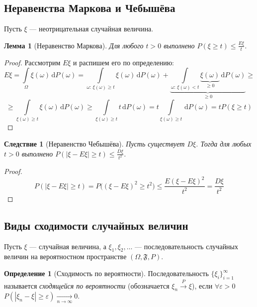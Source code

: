 \documentclass[11pt,openany,a4paper]{scrartcl}
\theoremstyle{plain}
\newtheorem{corollary}[theorem]{Следствие}
\newtheorem{lemma}[theorem]{Лемма}
\theoremstyle{definition}
\newtheorem{definition}[theorem]{Определение}
\newcommand{\underto}[1]{\xrightarrow[#1]{}}
\newcommand{\overto}[1]{\xrightarrow{#1}}
\newcommand{\dif}{\, \mathrm d}
\begin{document}
\subsection{Неравенства Маркова и Чебышёва}

Пусть $\xi$ — неотрицательная случайная величина.
\begin{lemma}[Неравенство Маркова]
    Для любого $t > 0$ выполнено $P(\xi \geqslant t) \leqslant \frac{E\xi}{t}$.
\end{lemma}
\begin{proof}
    Рассмотрим $E\xi$ и распишем его по определению:
    $$
    E\xi = \int\limits_\Omega \xi(\omega) \dif P(\omega) =
    \int\limits_{\omega:\, \xi(\omega)\geqslant t} \xi(\omega)\dif P(\omega) +
    \underbrace{\int\limits_{\omega:\, \xi(\omega) < t}
    \underbrace{\xi(\omega)}_{\geqslant 0} \dif P(\omega)}_{\geqslant 0} \geqslant
    $$
    $$
    \geqslant \int\limits_{\xi(\omega) \geqslant t} \xi(\omega)\dif P(\omega)
    \geqslant \int\limits_{\xi(\omega) \geqslant t} t\dif P(\omega) =
    t\int\limits_{\xi(\omega) \geqslant t} \dif P(\omega) =
    tP(\xi \geqslant t)
    $$
\end{proof}
\begin{corollary}[Неравенство Чебышёва]\label{chebyshevs_inequality}
    Пусть существует $D\xi$. Тогда для любых $t > 0$ выполнено
    $P(|\xi - E\xi| \geqslant t) \leqslant \frac{D\xi}{t^2}$.
\end{corollary}
\begin{proof}
    $$
    P(|\xi - E\xi| \geqslant t) = P\big((\xi - E\xi)^2 \geqslant t^2\big) \leqslant
    \frac{E(\xi - E\xi)^2}{t^2} = \frac{D\xi}{t^2}
    $$
\end{proof}

\subsection{Виды сходимости случайных величин}

Пусть $\xi$ — случайная величина, а
$\xi_1, \xi_2, \ldots$ — последовательность случайных величин на 
вероятностном пространстве $(\Omega, \mathfrak F, P)$.

\begin{definition}[Сходимость по вероятности]\label{convergence_in_probability}
    Последовательность $\{\xi_i\}_{i = 1}^\infty$ называется 
    \emph{сходящейся по вероятности} (обозначается $\xi_n \overto{P} \xi$), если
    $\forall \varepsilon > 0$ $P(|\xi_n - \xi| \geqslant \varepsilon)
    \underto{n \to \infty} 0$.    
\end{definition}
\end{document}
